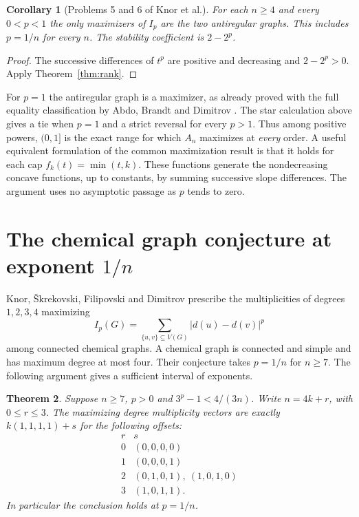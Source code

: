 \documentclass[11pt,a4paper]{article}
\newtheorem{theorem}{Theorem}[section]
\newtheorem{corollary}[theorem]{Corollary}
\theoremstyle{definition}\newtheorem{problem}[theorem]{Problem}
\begin{document}
\begin{corollary}[Problems 5 and 6 of Knor et al.]\label{cor:powers}
For each $n\ge4$ and every $0<p<1$ the only maximizers of $I_p$
are the two antiregular graphs. This includes $p=1/n$ for every $n$.
The stability coefficient is $2-2^p$.
\end{corollary}
\begin{proof}
The successive differences of $t^p$ are positive and decreasing and
$2-2^p>0$. Apply Theorem~\ref{thm:rank}.
\end{proof}
For $p=1$ the antiregular graph is a maximizer, as already proved
with the full equality classification by Abdo, Brandt and Dimitrov
\cite{abd}. The star calculation above gives a tie when $p=1$ and
a strict reversal for every $p>1$. Thus among positive powers, $(0,1]$
is the exact range for which $A_n$ maximizes at \emph{every} order.
A useful equivalent formulation of the common maximization result is
that it holds for each cap $f_k(t)=\min(t,k)$. These functions generate
the nondecreasing concave functions, up to constants, by summing
successive slope differences. The argument uses no asymptotic passage
as $p$ tends to zero.
\section{The chemical graph conjecture at exponent \texorpdfstring{$1/n$}{1/n}}
\label{sec:chem}

Knor, \v{S}krekovski, Filipovski and Dimitrov
\cite[Theorem~9 and Conjecture~10]{ksfd} prescribe the multiplicities of
degrees $1,2,3,4$ maximizing
\[
 I_p(G)=\sum_{\{u,v\}\subseteq V(G)}|d(u)-d(v)|^p
\]
among connected chemical graphs. A chemical graph is connected and simple and has maximum
degree at most four. Their conjecture takes $p=1/n$ for $n\ge7$.
The following argument gives a sufficient interval of exponents.

\begin{theorem}\label{thm:chem}
Suppose $n\ge7$, $p>0$ and $3^p-1<4/(3n)$. Write $n=4k+r$, with
$0\le r\le3$. The maximizing degree multiplicity vectors are exactly
$k(1,1,1,1)+s$ for the following offsets:
\[
\begin{array}{c|l}
r&s\\ \hline
0&(0,0,0,0)\\
1&(0,0,0,1)\\
2&(0,1,0,1),\ (1,0,1,0)\\
3&(1,0,1,1).
\end{array}
\]
In particular the conclusion holds at $p=1/n$.
\end{theorem}
\end{document}

